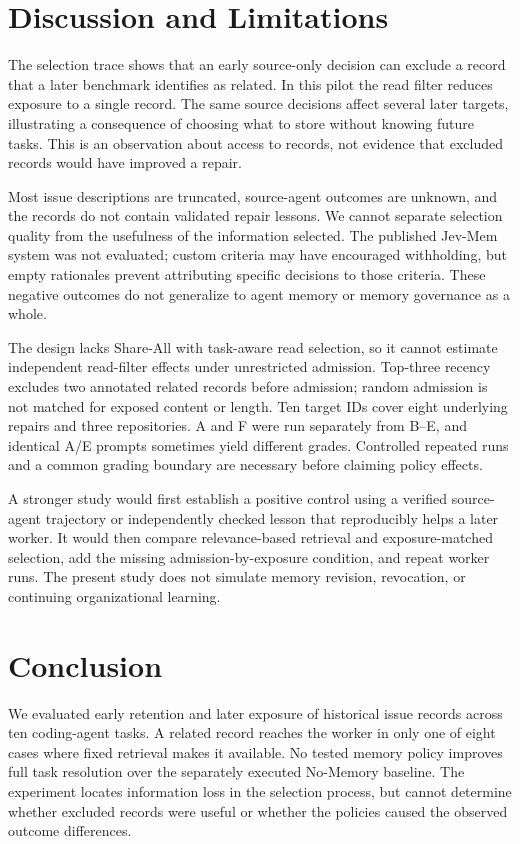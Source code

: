 \documentclass[sigconf,anonymous]{aamas}
\begin{document}
\section{Discussion and Limitations}
The selection trace shows that an early source-only decision can exclude a record that a later benchmark identifies as related. In this pilot the read filter reduces exposure to a single record. The same source decisions affect several later targets, illustrating a consequence of choosing what to store without knowing future tasks. This is an observation about access to records, not evidence that excluded records would have improved a repair.

Most issue descriptions are truncated, source-agent outcomes are unknown, and the records do not contain validated repair lessons. We cannot separate selection quality from the usefulness of the information selected. The published Jev-Mem system was not evaluated; custom criteria may have encouraged withholding, but empty rationales prevent attributing specific decisions to those criteria. These negative outcomes do not generalize to agent memory or memory governance as a whole.

The design lacks Share-All with task-aware read selection, so it cannot estimate independent read-filter effects under unrestricted admission. Top-three recency excludes two annotated related records before admission; random admission is not matched for exposed content or length. Ten target IDs cover eight underlying repairs and three repositories. A and F were run separately from B--E, and identical A/E prompts sometimes yield different grades. Controlled repeated runs and a common grading boundary are necessary before claiming policy effects.

A stronger study would first establish a positive control using a verified source-agent trajectory or independently checked lesson that reproducibly helps a later worker. It would then compare relevance-based retrieval and exposure-matched selection, add the missing admission-by-exposure condition, and repeat worker runs. The present study does not simulate memory revision, revocation, or continuing organizational learning.

\section{Conclusion}
We evaluated early retention and later exposure of historical issue records across ten coding-agent tasks. A related record reaches the worker in only one of eight cases where fixed retrieval makes it available. No tested memory policy improves full task resolution over the separately executed No-Memory baseline. The experiment locates information loss in the selection process, but cannot determine whether excluded records were useful or whether the policies caused the observed outcome differences.



\end{document}
